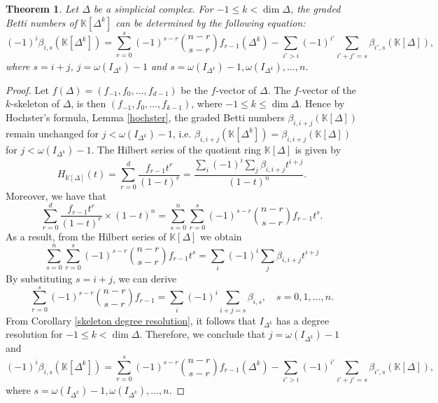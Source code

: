 \documentclass[a4paper,12pt]{amsart}
\numberwithin{equation}{section}
\newtheorem{theorem}{Theorem}[section]
\theoremstyle{definition}
\newcommand{\K}[0]{\mathbb{K}}
\begin{document}
\begin{theorem}\label{Betti k-skeleton}
	Let $\Delta$ be a simplicial complex. For $-1\le k<\dim\Delta$, the graded Betti numbers of $\K[\Delta^k]$ can be determined by the following equation:
	$$(-1)^{i}\beta_{i,s}(\K[\Delta^k])=\sum_{r=0}^{s}(-1)^{s-r}\binom{n-r}{s-r}f_{r-1}(\Delta^k)-\sum_{i'>i}(-1)^{i'}\sum_{i'+j'=s}\beta_{i',s}(\K[\Delta]),$$
	where $s=i+j$, $j=\omega(I_{\Delta^k})-1$ and $s=\omega(I_{\Delta^k})-1,\omega(I_{\Delta^k}),\dots,n$.
\end{theorem}
\begin{proof}
	Let $f(\Delta)=(f_{-1},f_0,\dots,f_{d-1})$ be the $f$-vector of $\Delta$. The $f$-vector of the $k$-skeleton of $\Delta$, is then $(f_{-1},f_0,\dots,f_{k-1})$, where $-1\le k\le\dim\Delta$. Hence by Hochster’s formula, Lemma \ref{hochster}, the graded Betti numbers $\beta_{i,i+j}(\K[\Delta])$ remain unchanged for $j<\omega(I_{\Delta^k})-1$, i.e. $\beta_{i,i+j}(\K[\Delta^k])=\beta_{i,i+j}(\K[\Delta])$ for $j<\omega(I_{\Delta^k})-1$. The Hilbert series of the quotient ring $\K[\Delta]$ is given by
	$$H_{\K[\Delta]}(t)=\sum_{r=0}^{d} \frac{f_{r-1} t^{r}}{(1-t)^{r}}=\frac{\sum_i(-1)^i\sum_j\beta_{i,i+j}t^{i+j}}{(1-t)^n}.$$
	Moreover, we have that
	$$\displaystyle\sum_{r=0}^{d} \frac{f_{r-1} t^{r}}{(1-t)^{r}}\times(1-t)^n=\sum_{s=0}^{n}\sum_{r=0}^{s}(-1)^{s-r}\binom{n-r}{s-r}f_{r-1}t^s.$$
	As a result, from the Hilbert series of $\K[\Delta]$ we obtain
	$$\sum_{s=0}^{n}\sum_{r=0}^{s}(-1)^{s-r}\binom{n-r}{s-r}f_{r-1}t^s=\sum_{i}(-1)^i\sum_j\beta_{i,i+j}t^{i+j}$$
	By substituting $s=i+j$, we can derive
	$$\sum_{r=0}^{s}(-1)^{s-r}\binom{n-r}{s-r}f_{r-1}=\sum_{i}(-1)^i\sum_{i+j=s}\beta_{i,s},\quad s=0,1,\dots,n.$$
	From Corollary \ref{skeleton degree resolution}, it follows that $I_{\Delta^k}$ has a degree resolution for $-1\le k<\dim\Delta$. Therefore, we conclude that $j=\omega(I_{\Delta^k})-1$ and
	$$(-1)^{i}\beta_{i,s}(\K[\Delta^k])=\sum_{r=0}^{s}(-1)^{s-r}\binom{n-r}{s-r}f_{r-1}(\Delta^k)-\sum_{i'>i}(-1)^{i'}\sum_{i'+j'=s}\beta_{i',s}(\K[\Delta]),$$
	where $s=\omega(I_{\Delta^k})-1,\omega(I_{\Delta^k}),\dots,n$.
\end{proof}
\end{document}
